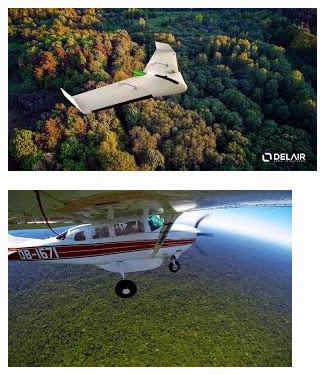 \begin{figure}
    \includegraphics[width=\textwidth]{Imagenes/dron.jpg}
     \hfill
    \label{dron}
\end{figure}

\begin{figure}
    \includegraphics[width=\textwidth]{Imagenes/avion.jpg}
     \hfill
    \label{avion}
\end{figure}

